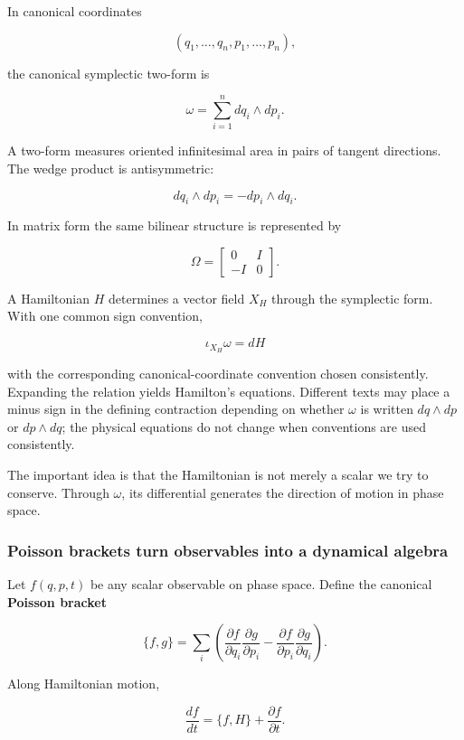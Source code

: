 In canonical coordinates

\[
(q_1,\ldots,q_n,p_1,\ldots,p_n),
\]

the canonical symplectic two-form is

\[
\boxed{
\omega
=
\sum_{i=1}^{n}
dq_i\wedge dp_i
}.
\]

A two-form measures oriented infinitesimal area in pairs of tangent directions. The wedge product is antisymmetric:

\[
dq_i\wedge dp_i
=
-
dp_i\wedge dq_i.
\]

In matrix form the same bilinear structure is represented by

\[
\Omega
=
\begin{bmatrix}
0&I\\
-I&0
\end{bmatrix}.
\]

A Hamiltonian \(H\) determines a vector field \(X_H\) through the symplectic form. With one common sign convention,

\[
\boxed{
\iota_{X_H}\omega=dH
}
\]

with the corresponding canonical-coordinate convention chosen consistently. Expanding the relation yields Hamilton's equations. Different texts may place a minus sign in the defining contraction depending on whether \(\omega\) is written \(dq\wedge dp\) or \(dp\wedge dq\); the physical equations do not change when conventions are used consistently.

The important idea is that the Hamiltonian is not merely a scalar we try to conserve. Through \(\omega\), its differential generates the direction of motion in phase space.

\subsubsection{Poisson brackets turn observables into a dynamical algebra}\label{02-foundations-ii-ch025-poisson-brackets-turn-observables-into-a-dynamical-algebra}

Let \(f(q,p,t)\) be any scalar observable on phase space. Define the canonical \textbf{Poisson bracket}

\[
\boxed{
\{f,g\}
=
\sum_i
\left(
\frac{\partial f}{\partial q_i}
\frac{\partial g}{\partial p_i}
-
\frac{\partial f}{\partial p_i}
\frac{\partial g}{\partial q_i}
\right)
}.
\]

Along Hamiltonian motion,

\[
\boxed{
\frac{df}{dt}
=
\{f,H\}
+
\frac{\partial f}{\partial t}
}.
\]

